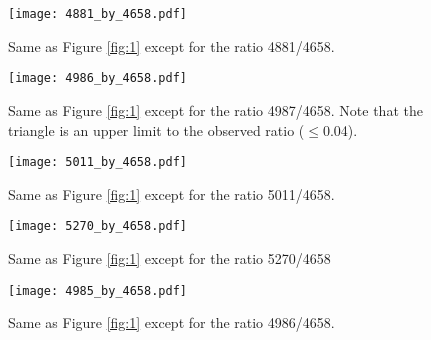\documentclass{emulateapj}
\begin{document}



\begin{figure*}
  \centering 


\texttt{[image: 4881\_by\_4658.pdf]} 

\caption{ Same as Figure \ref{fig:1} except for the ratio 4881/4658.}\label{fig:5}
\end{figure*}







\begin{figure*}
  \centering 


\texttt{[image: 4986\_by\_4658.pdf]} 


\caption{Same as Figure \ref{fig:1} except for the ratio 4987/4658. Note that the triangle is an upper limit to the 
observed ratio ($\leq$0.04).}\label{fig:6}
\end{figure*}








\begin{figure*}
  \centering 

\texttt{[image: 5011\_by\_4658.pdf]} 


\caption{Same as Figure \ref{fig:1} except for the ratio 5011/4658.}\label{fig:7}
\end{figure*}




\begin{figure*}
  \centering 


\texttt{[image: 5270\_by\_4658.pdf]} 

\caption{Same as Figure \ref{fig:1} except for the ratio 5270/4658}\label{fig:8}
\end{figure*}





\begin{figure}[h!]
  \centering 
\texttt{[image: 4985\_by\_4658.pdf]} 
\caption{Same as Figure \ref{fig:1} except for the ratio 4986/4658.  }\label{fig:9}
\end{figure}
\end{document}
